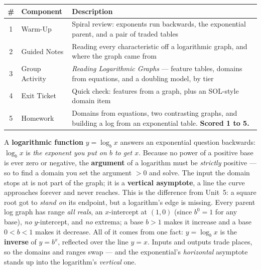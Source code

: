 \documentclass[10pt]{article}
\begin{document}
\begin{tocbox}
\small
\renewcommand{\arraystretch}{1.5}
\begin{tabularx}{\linewidth}{@{} c l X @{}}
\rowcolor{forestbg}
\textbf{\#} & \textbf{Component} & \textbf{Description} \\
\midrule
1 & Warm-Up        & Spiral review: exponents run backwards, the exponential parent, and a pair of traded tables \\
2 & Guided Notes   & Reading every characteristic off a logarithmic graph, and where the graph came from \\
3 & Group Activity & \emph{Reading Logarithmic Graphs} --- feature tables, domains from equations, and a doubling model, by tier \\
4 & Exit Ticket    & Quick check: features from a graph, plus an SOL-style domain item \\
5 & Homework       & Domains from equations, two contrasting graphs, and building a log from an exponential table. \textbf{Scored 1 to 5.} \\
\end{tabularx}
\end{tocbox}

\vspace{0.10in}

\begin{remindbox}
\small A \textbf{logarithmic function} $y=\log_b x$ answers an exponential question backwards:
$\log_b x$ is \emph{the exponent you put on $b$ to get $x$}. Because no power of a positive base is
ever zero or negative, the \textbf{argument} of a logarithm must be \emph{strictly} positive --- so
to find a domain you set the argument $>0$ and solve. The input the domain stops at is not part of
the graph; it is a \textbf{vertical asymptote}, a line the curve approaches forever and never
reaches. This is the difference from Unit~5: a square root got to \emph{stand on} its endpoint, but a
logarithm's edge is missing. Every parent log graph has range \emph{all reals}, an $x$-intercept at
$(1,0)$ (since $b^0=1$ for any base), \emph{no} $y$-intercept, and \emph{no} extrema; a base $b>1$
makes it increase and a base $0<b<1$ makes it decrease. All of it comes from one fact: $y=\log_b x$
is the \textbf{inverse} of $y=b^x$, reflected over the line $y=x$. Inputs and outputs trade places,
so the domains and ranges swap --- and the exponential's \emph{horizontal} asymptote stands up into
the logarithm's \emph{vertical} one.
\end{remindbox}
\end{document}
